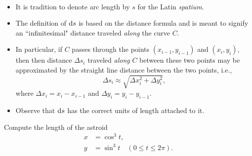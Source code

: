 \begin{remark}\,
\begin{itemize}
\item It is tradition to denote arc length by $s$ for the Latin \textit{spatium}.
\item The definition of $\mathrm{d} s$ is based on the distance formula and is meant to signify an ``infinitesimal" distance traveled \textit{along} the curve $C$.  
\item In particular, if $C$ passes through the points $(x_{i-1}, y_{i-1})$ and $(x_i, y_i)$, then then distance $\Delta s_i$ traveled \textit{along} $C$ between these two points may be approximated by the straight line distance between the two points, i.e.,
\begin{equation*}
\Delta s_i \approx \sqrt{\Delta x_i^2 + \Delta y_i^2},
\end{equation*}
where $\Delta x_i = x_i-x_{i-1}$ and $\Delta y_i = y_i - y_{i-1}$.
\item Observe that $\mathrm{d} s$ has the correct units of length attached to it.
\end{itemize}
\end{remark}
\newpage

\begin{example}
Compute the length of the astroid
\begin{align*}
x &= \cos^3 t,\\
y &= \sin^3 t\quad (0\le t\le 2\pi).
\end{align*}
\end{example}
\ifdefined\SOLUTION
{}
\else
\fi
\newpage



